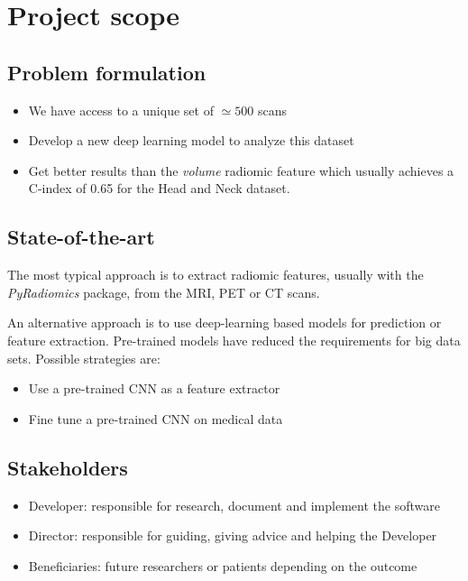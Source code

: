 \section{Project scope}
\subsection{Problem formulation}
\begin{frame}{\insertsubsec}
  \begin{itemize}
    \item We have access to a unique set of \( \simeq 500 \) scans
    \item Develop a new deep learning model to analyze this dataset
    \item Get better results than the \emph{volume} radiomic feature which usually achieves
    a C-index of 0.65 for the Head and Neck dataset. 
  \end{itemize}
\end{frame}

\subsection{State-of-the-art}
\begin{frame}{\insertsubsec}
  The most typical approach is to extract radiomic features, usually with
  the \emph{PyRadiomics} package, from the MRI, PET or CT scans.

  \vspace{.5cm}
  An alternative approach is to use deep-learning based models for prediction or 
  feature extraction. Pre-trained models have reduced the requirements for big data sets.
  Possible strategies are:
  \begin{itemize}
    \item Use a pre-trained CNN as a feature extractor
    \item Fine tune a pre-trained CNN on medical data
  \end{itemize}
  
\end{frame}

\subsection{Stakeholders}
\begin{frame}{\insertsubsec}
  \begin{itemize}
    \item Developer: responsible for research, document and implement the software
    \item Director: responsible for guiding, giving advice and helping the Developer
    \item Beneficiaries: future researchers or patients depending on the outcome
  \end{itemize}
\end{frame}

